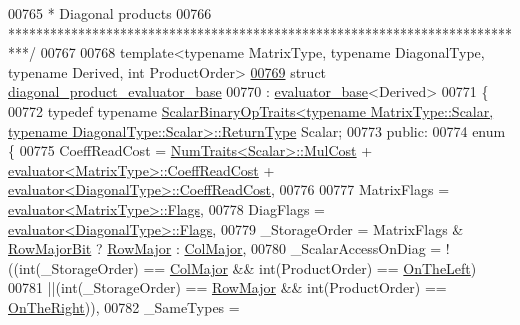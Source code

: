 \begin{DoxyCode}
00765 \textcolor{comment}{* Diagonal products}
00766 \textcolor{comment}{***************************************************************************/}
00767   
00768 \textcolor{keyword}{template}<\textcolor{keyword}{typename} MatrixType, \textcolor{keyword}{typename} DiagonalType, \textcolor{keyword}{typename} Derived, \textcolor{keywordtype}{int} ProductOrder>
\hyperlink{struct_eigen_1_1internal_1_1diagonal__product__evaluator__base}{00769} \textcolor{keyword}{struct }\hyperlink{struct_eigen_1_1internal_1_1diagonal__product__evaluator__base}{diagonal\_product\_evaluator\_base}
00770   : \hyperlink{struct_eigen_1_1internal_1_1evaluator__base}{evaluator\_base}<Derived>
00771 \{
00772    \textcolor{keyword}{typedef} \textcolor{keyword}{typename} 
      \hyperlink{group___core___module_struct_eigen_1_1_scalar_binary_op_traits}{ScalarBinaryOpTraits<typename MatrixType::Scalar, typename DiagonalType::Scalar>::ReturnType}
       Scalar;
00773 \textcolor{keyword}{public}:
00774   \textcolor{keyword}{enum} \{
00775     CoeffReadCost = \hyperlink{group___core___module_struct_eigen_1_1_num_traits}{NumTraits<Scalar>::MulCost} + 
      \hyperlink{struct_eigen_1_1internal_1_1evaluator}{evaluator<MatrixType>::CoeffReadCost} + 
      \hyperlink{struct_eigen_1_1internal_1_1evaluator}{evaluator<DiagonalType>::CoeffReadCost},
00776     
00777     MatrixFlags = \hyperlink{struct_eigen_1_1internal_1_1evaluator}{evaluator<MatrixType>::Flags},
00778     DiagFlags = \hyperlink{struct_eigen_1_1internal_1_1evaluator}{evaluator<DiagonalType>::Flags},
00779     \_StorageOrder = MatrixFlags & \hyperlink{group__flags_gae4f56c2a60bbe4bd2e44c5b19cbe8762}{RowMajorBit} ? \hyperlink{group__enums_ggaacded1a18ae58b0f554751f6cdf9eb13acfcde9cd8677c5f7caf6bd603666aae3}{RowMajor} : 
      \hyperlink{group__enums_ggaacded1a18ae58b0f554751f6cdf9eb13a0cbd4bdd0abcfc0224c5fcb5e4f6669a}{ColMajor},
00780     \_ScalarAccessOnDiag =  !((int(\_StorageOrder) == \hyperlink{group__enums_ggaacded1a18ae58b0f554751f6cdf9eb13a0cbd4bdd0abcfc0224c5fcb5e4f6669a}{ColMajor} && int(ProductOrder) == 
      \hyperlink{group__enums_ggac22de43beeac7a78b384f99bed5cee0ba129609b3bdf23b071f5f86cf2f995ec4}{OnTheLeft})
00781                            ||(\textcolor{keywordtype}{int}(\_StorageOrder) == \hyperlink{group__enums_ggaacded1a18ae58b0f554751f6cdf9eb13acfcde9cd8677c5f7caf6bd603666aae3}{RowMajor} && int(ProductOrder) == 
      \hyperlink{group__enums_ggac22de43beeac7a78b384f99bed5cee0ba99dc75d8e00b6c3a5bdc31940f47492b}{OnTheRight})),
00782     \_SameTypes = 

\end{DoxyCode}
